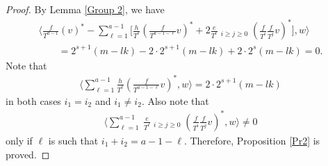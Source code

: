 \begin{proof}
By Lemma \ref{Group 2}, we have
\begin{gather*}
\bigg\langle \frac{f}{T^{a-1}} (v)^*-
\sum_{\ell=1}^{a-1}\bigg[\frac{h}{T^{\ell}}\left(
\frac{f}{T^{a-1-\ell}}v\right)^* + 2\frac{e}{T^{\ell}} \mathop{\sum_{i+j=a-1-\ell}}_{i\geq j\geq 0} \left(\frac{f}{T^i}\frac{f}{T^j}v\right)^*\bigg], w \bigg\rangle \\
\qquad{} = 2^{s+1} (m-lk) - 2 \cdot 2^{s+1} (m-lk) + 2 \cdot 2^{s} (m-lk) = 0.
\end{gather*}
Note that
\begin{gather*}
 \bigg\langle \sum_{\ell=1}^{a-1} \frac{h}{T^{\ell}}\left(\frac{f}{T^{a-1-\ell}}v\right)^*, w \bigg\rangle = 2 \cdot 2^{s+1} (m - lk)
\end{gather*}
in both cases $i_1 = i_2$ and $i_1 \ne i_2$. Also note that
\begin{gather*}
\bigg\langle \sum_{\ell=1}^{a-1}\ \frac{e}{T^{\ell}} \mathop{\sum_{i+j=a-1-\ell}}_{i\geq j\geq 0} \left(\frac{f}{T^i}\frac{f}{T^j}v\right)^*, w \bigg\rangle \ne 0
\end{gather*}
only if $\ell$ is such that $i_1+i_2 = a-1-\ell$. Therefore, Proposition \ref{Pr2} is proved.
\end{proof}

